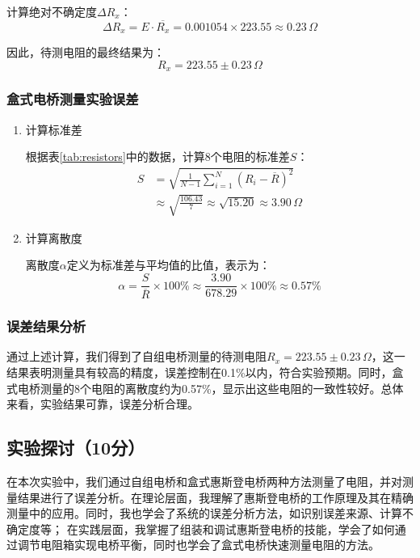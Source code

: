 \documentclass[]{../../templates/Report}%
\begin{document}
\begin{fullreportonly}
\begin{enumerate}
    计算绝对不确定度$\Delta R_x$：
    \begin{equation}
        \Delta R_x = E \cdot \overline{R_x} = 0.001054 \times 223.55 \approx 0.23\,\Omega
    \end{equation}

\end{enumerate}    
因此，待测电阻的最终结果为：
    \begin{equation}
        \boxed{R_x = 223.55 \pm 0.23\,\Omega}
    \end{equation}

\subsubsection{盒式电桥测量实验误差}
    
\begin{enumerate}
    \item 计算标准差
    
根据表\ref{tab:resistors}中的数据，计算8个电阻的标准差$S$：
\begin{align*}
    S &= \sqrt{\frac{1}{N-1} \sum_{i=1}^{N} (R_i - \overline{R})^2} \\
      &\approx \sqrt{\frac{106.43}{7}} \approx \sqrt{15.20} \approx 3.90\,\Omega
\end{align*}

    \item 计算离散度

离散度$\alpha$定义为标准差与平均值的比值，表示为：
\begin{equation}
    \alpha = \frac{S}{\overline{R}} \times 100\% \approx \frac{3.90}{678.29} \times 100\% \approx 0.57\%
\end{equation}

\end{enumerate} 

\subsubsection{误差结果分析}
通过上述计算，我们得到了自组电桥测量的待测电阻$R_x = 223.55 \pm 0.23\,\Omega$，这一结果表明测量具有较高的精度，误差控制在0.1\%以内，符合实验预期。同时，盒式电桥测量的8个电阻的离散度约为0.57\%，显示出这些电阻的一致性较好。总体来看，实验结果可靠，误差分析合理。


\subsection{实验探讨（10分）}
在本次实验中，我们通过自组电桥和盒式惠斯登电桥两种方法测量了电阻，并对测量结果进行了误差分析。在理论层面，我理解了惠斯登电桥的工作原理及其在精确测量中的应用。同时，我也学会了系统的误差分析方法，如识别误差来源、计算不确定度等；
在实践层面，我掌握了组装和调试惠斯登电桥的技能，学会了如何通过调节电阻箱实现电桥平衡，同时也学会了盒式电桥快速测量电阻的方法。


\end{fullreportonly}
\end{document}
